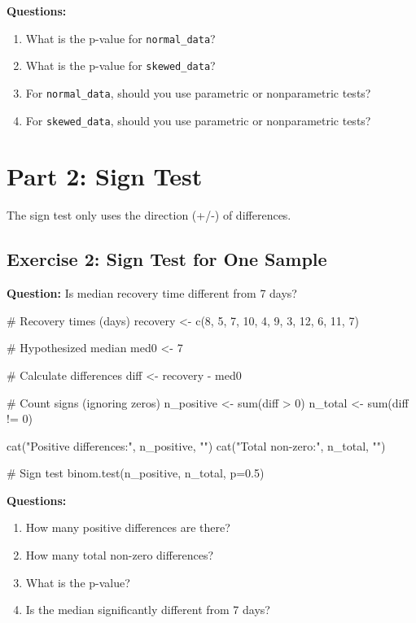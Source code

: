 \documentclass[11pt]{article}
\begin{document}
\textbf{Questions:}
\begin{enumerate}
\item What is the p-value for \texttt{normal\_data}?
\item What is the p-value for \texttt{skewed\_data}?
\item For \texttt{normal\_data}, should you use parametric or nonparametric tests?
\item For \texttt{skewed\_data}, should you use parametric or nonparametric tests?
\end{enumerate}

\vspace{1cm}

\section{Part 2: Sign Test}

The sign test only uses the direction (+/-) of differences.

\subsection{Exercise 2: Sign Test for One Sample}

\textbf{Question:} Is median recovery time different from 7 days?

\begin{rcode}
# Recovery times (days)
recovery <- c(8, 5, 7, 10, 4, 9, 3, 12, 6, 11, 7)

# Hypothesized median
med0 <- 7

# Calculate differences
diff <- recovery - med0

# Count signs (ignoring zeros)
n_positive <- sum(diff > 0)
n_total <- sum(diff != 0)

cat("Positive differences:", n_positive, "\n")
cat("Total non-zero:", n_total, "\n")

# Sign test
binom.test(n_positive, n_total, p=0.5)
\end{rcode}

\textbf{Questions:}
\begin{enumerate}
\item How many positive differences are there?
\item How many total non-zero differences?
\item What is the p-value?
\item Is the median significantly different from 7 days?
\end{enumerate}
\end{document}
